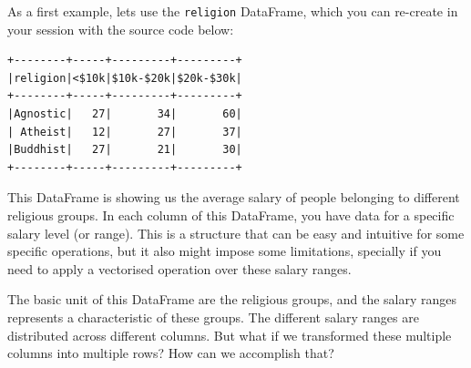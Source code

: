 \documentclass[
  11pt,
  letterpaper,
  DIV=11,
  numbers=noendperiod]{scrreprt}
\newenvironment{Shaded}{\begin{snugshade}}{\end{snugshade}}
\newcommand{\DecValTok}[1]{\textcolor[rgb]{0.68,0.00,0.00}{#1}}
\newcommand{\NormalTok}[1]{\textcolor[rgb]{0.00,0.23,0.31}{#1}}
\newcommand{\OperatorTok}[1]{\textcolor[rgb]{0.37,0.37,0.37}{#1}}
\newcommand{\StringTok}[1]{\textcolor[rgb]{0.13,0.47,0.30}{#1}}
\begin{document}
As a first example, lets use the \texttt{religion} DataFrame, which you
can re-create in your session with the source code below:

\begin{Shaded}
\end{Shaded}

\begin{verbatim}
+--------+-----+---------+---------+
|religion|<$10k|$10k-$20k|$20k-$30k|
+--------+-----+---------+---------+
|Agnostic|   27|       34|       60|
| Atheist|   12|       27|       37|
|Buddhist|   27|       21|       30|
+--------+-----+---------+---------+
\end{verbatim}

This DataFrame is showing us the average salary of people belonging to
different religious groups. In each column of this DataFrame, you have
data for a specific salary level (or range). This is a structure that
can be easy and intuitive for some specific operations, but it also
might impose some limitations, specially if you need to apply a
vectorised operation over these salary ranges.

The basic unit of this DataFrame are the religious groups, and the
salary ranges represents a characteristic of these groups. The different
salary ranges are distributed across different columns. But what if we
transformed these multiple columns into multiple rows? How can we
accomplish that?
\end{document}
